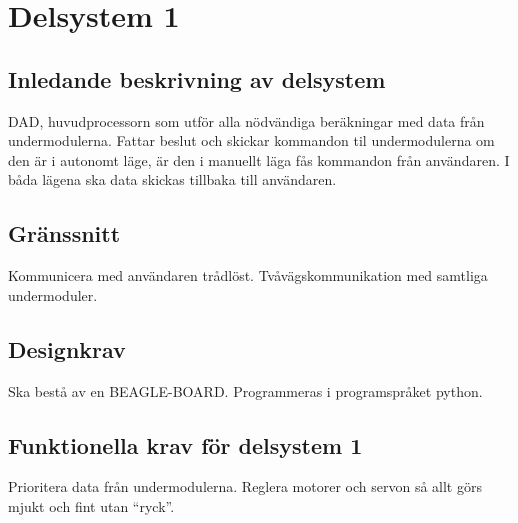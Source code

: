 \section{Delsystem 1}

\subsection{Inledande beskrivning av delsystem}
DAD, huvudprocessorn som utför alla nödvändiga beräkningar med data från undermodulerna. Fattar beslut och skickar kommandon til undermodulerna om den är i autonomt läge, är den i manuellt läga fås kommandon från användaren. I båda lägena ska data skickas tillbaka till användaren.

\subsection{Gränssnitt}
Kommunicera med användaren trådlöst. 
Tvåvägskommunikation med samtliga undermoduler. 

\subsection{Designkrav}
Ska bestå av en BEAGLE-BOARD.
Programmeras i programspråket python.

\subsection{Funktionella krav för delsystem 1}	
Prioritera data från undermodulerna. 
Reglera motorer och servon så allt görs mjukt och fint utan “ryck”.